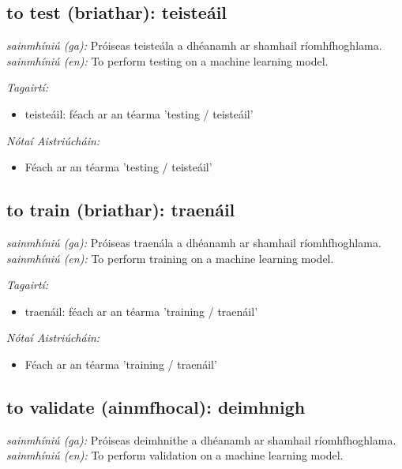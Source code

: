 \documentclass{article}
\begin{document}
\subsection*{to test (briathar): teisteáil} 
 \noindent \textit{sainmhíniú (ga):} Próiseas teisteála a dhéanamh ar shamhail ríomhfhoghlama.
\newline\newline
 \noindent \textit{sainmhíniú (en):} To perform testing on a machine learning model.
\newline

 \noindent \textit{Tagairtí:}
\begin{itemize}
	\item teisteáil: féach ar an téarma 'testing / teisteáil'
\end{itemize}

 \noindent \textit{Nótaí Aistriúcháin:}
\begin{itemize}
	\item Féach ar an téarma 'testing / teisteáil'
\end{itemize}


\subsection*{to train (briathar): traenáil} 
 \noindent \textit{sainmhíniú (ga):} Próiseas traenála a dhéanamh ar shamhail ríomhfhoghlama.
\newline\newline
 \noindent \textit{sainmhíniú (en):} To perform training on a machine learning model.
\newline

 \noindent \textit{Tagairtí:}
\begin{itemize}
	\item traenáil: féach ar an téarma 'training / traenáil'
\end{itemize}

 \noindent \textit{Nótaí Aistriúcháin:}
\begin{itemize}
	\item Féach ar an téarma 'training / traenáil'
\end{itemize}


\subsection*{to validate (ainmfhocal): deimhnigh} 
 \noindent \textit{sainmhíniú (ga):} Próiseas deimhnithe a dhéanamh ar shamhail ríomhfhoghlama.
\newline\newline
 \noindent \textit{sainmhíniú (en):} To perform validation on a machine learning model.
\newline
\end{document}
